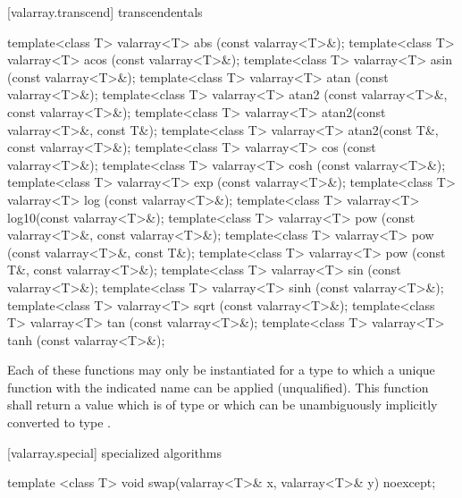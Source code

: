 [valarray.transcend]{ transcendentals}

%
%
%
%
%
%
%
%
%
%
%
%
%
%
%
%
\begin{itemdecl}
template<class T> valarray<T> abs  (const valarray<T>&);
template<class T> valarray<T> acos (const valarray<T>&);
template<class T> valarray<T> asin (const valarray<T>&);
template<class T> valarray<T> atan (const valarray<T>&);
template<class T> valarray<T> atan2
    (const valarray<T>&, const valarray<T>&);
template<class T> valarray<T> atan2(const valarray<T>&, const T&);
template<class T> valarray<T> atan2(const T&, const valarray<T>&);
template<class T> valarray<T> cos  (const valarray<T>&);
template<class T> valarray<T> cosh (const valarray<T>&);
template<class T> valarray<T> exp  (const valarray<T>&);
template<class T> valarray<T> log  (const valarray<T>&);
template<class T> valarray<T> log10(const valarray<T>&);
template<class T> valarray<T> pow
    (const valarray<T>&, const valarray<T>&);
template<class T> valarray<T> pow  (const valarray<T>&, const T&);
template<class T> valarray<T> pow  (const T&, const valarray<T>&);
template<class T> valarray<T> sin  (const valarray<T>&);
template<class T> valarray<T> sinh (const valarray<T>&);
template<class T> valarray<T> sqrt (const valarray<T>&);
template<class T> valarray<T> tan  (const valarray<T>&);
template<class T> valarray<T> tanh (const valarray<T>&);
\end{itemdecl}

\begin{itemdescr}
\pnum
Each of these functions may only be instantiated for a type 
to which a unique function with the indicated name can be applied (unqualified).
This function shall return a value which is of type 
or which can be unambiguously implicitly converted to type .
\end{itemdescr}

[valarray.special]{ specialized algorithms}

%
%
\begin{itemdecl}
template <class T> void swap(valarray<T>& x, valarray<T>& y) noexcept;
\end{itemdecl}

